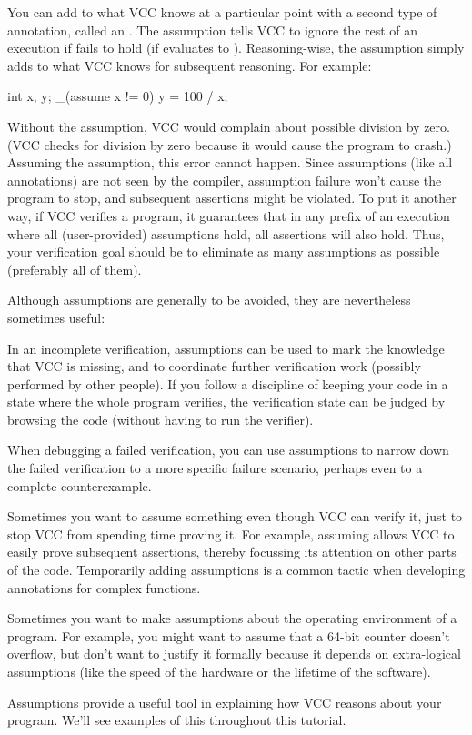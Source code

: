 You can add to what VCC knows at a particular point with a second
type of annotation, called an .
The assumption  tells VCC to ignore
the rest of an execution if  fails to hold (\ie if
 evaluates to ). 
Reasoning-wise, the assumption simply adds  to what VCC
knows for subsequent reasoning. For example:
\begin{VCC}
int x, y;
_(assume x != 0)
y = 100 / x;
\end{VCC}
Without the assumption, VCC would complain about possible division by
zero. (VCC checks for division by zero because it would cause the
program to crash.)  Assuming the assumption, this error cannot happen.  
Since assumptions (like all annotations) are not seen by the compiler,
assumption failure won't cause the program to stop, and subsequent assertions
might be violated. To put it another way, if VCC verifies a program,
it guarantees that in any prefix of an execution
where all (user-provided) assumptions hold, all assertions will also
hold. Thus, your verification goal should be to eliminate as many assumptions as
possible (preferably all of them).

\begin{note}
Although assumptions are generally to be avoided, they are nevertheless
sometimes useful:
\begin{inparaenum}
\item In an incomplete verification, assumptions can be used to mark
  the knowledge that VCC is missing, and to coordinate further
  verification work (possibly performed by other people). If you
  follow a discipline of keeping your code in a state where the whole 
  program verifies, the verification state can be judged by browsing
  the code (without having to run the verifier).

\item When debugging a failed verification, you can use assumptions to
  narrow down the failed verification to a more specific failure
  scenario, perhaps even to a complete counterexample. 

\item Sometimes you want to assume something even though VCC can
  verify it, just to stop VCC from spending time proving it. For
  example, assuming \vcc{\false} allows VCC to 
  easily prove subsequent assertions, thereby focussing its
  attention on other parts of the code. Temporarily adding assumptions
  is a common tactic when developing annotations for complex functions.

\item Sometimes you want to make assumptions about the operating
  environment of a program. For example, you might want to assume that
  a 64-bit counter doesn't overflow, but don't want to justify it
  formally because it depends on extra-logical assumptions (like the
  speed of the hardware or the lifetime of the software). 

\item Assumptions provide a useful tool in explaining how VCC
  reasons about your program. We'll see examples of this throughout
  this tutorial.
\end{inparaenum}
\end{note}

